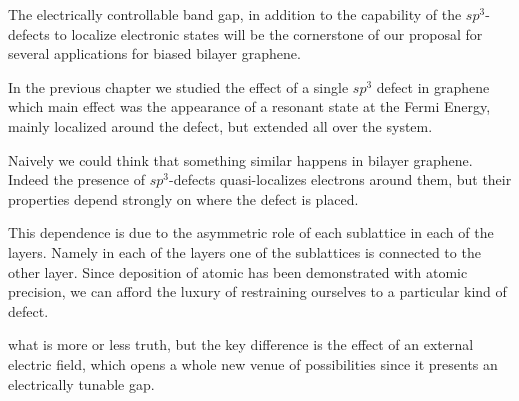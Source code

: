 The electrically controllable band gap, in addition to the capability of the $sp^3$-defects to localize electronic states will be the cornerstone of our proposal for several applications for biased bilayer graphene.
\medskip


In the previous chapter we studied the effect of a single $sp^3$ defect in graphene which main effect was the appearance of a resonant state at the Fermi Energy, mainly localized around the defect, but extended all over the system.
\smallskip

Naively we could think that something similar happens in bilayer graphene. Indeed the presence of $sp^3$-defects quasi-localizes electrons around them, but their properties depend strongly on where the defect is placed.



This dependence is due to the asymmetric role of each sublattice in each of the layers. Namely in each of the layers one of the sublattices is connected to the other layer.
Since deposition of atomic  has been demonstrated with atomic precision\cite{Brihuega2016}, we can afford the luxury of restraining ourselves to a particular kind of defect.

what is more or less truth, but the key difference is the effect of an external electric field, which opens a whole new venue of possibilities since it presents an electrically tunable gap.



